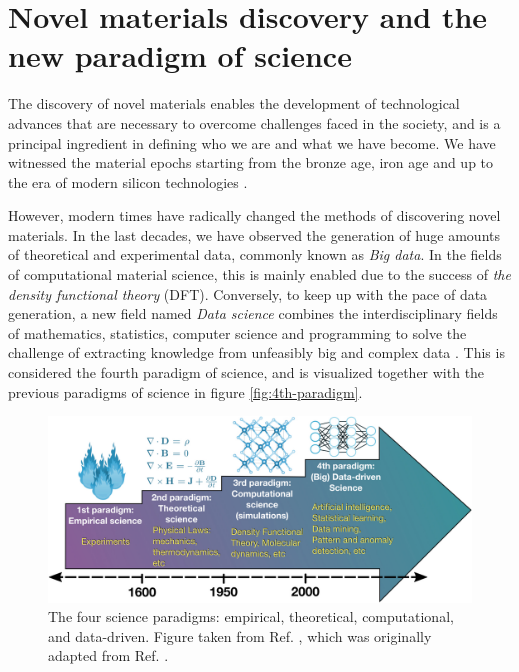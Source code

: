 \chapter{Novel materials discovery and the new paradigm of science}
%

The discovery of novel materials enables the development of technological advances that are necessary to overcome challenges faced in the society, and is a principal ingredient in defining who we are and what we have become. We have witnessed the material epochs starting from the bronze age, iron age and up to the era of modern silicon technologies \cite{Jain2016, Magee2012}.

However, modern times have radically changed the methods of discovering novel materials. In the last decades, we have observed the generation of huge amounts of theoretical and experimental data, commonly known as \textit{Big data}. In the fields of computational material science, this is mainly enabled due to the success of \textit{the density functional theory} (DFT). Conversely, to keep up with the pace of data generation, a new field named \textit{Data science} combines the interdisciplinary fields of mathematics, statistics, computer science and programming to solve the challenge of extracting knowledge from unfeasibly big and complex data \cite{Agrawal2016, Schleder2019}. This is considered the fourth paradigm of science, and is visualized together with the previous paradigms of science in figure \autoref{fig:4th-paradigm}.

\begin{figure}[ht!]
  \centering
  \includegraphics{theory/figures/4th-paradigm-hd.jpg}
  \caption{The four science paradigms: empirical, theoretical, computational, and data-driven. Figure taken from Ref.  \cite{Schleder2019}, which was originally adapted from Ref. \cite{Agrawal2016}.}
  \label{fig:4th-paradigm}
\end{figure}

